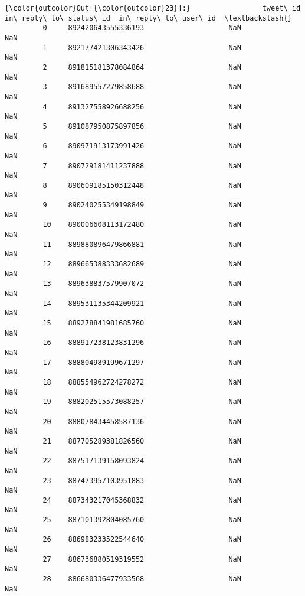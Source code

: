 \documentclass[11pt]{article}
\begin{document}
\begin{Verbatim}[commandchars=\\\{\}]
{\color{outcolor}Out[{\color{outcolor}23}]:}                 tweet\_id  in\_reply\_to\_status\_id  in\_reply\_to\_user\_id  \textbackslash{}
         0     892420643555336193                    NaN                  NaN   
         1     892177421306343426                    NaN                  NaN   
         2     891815181378084864                    NaN                  NaN   
         3     891689557279858688                    NaN                  NaN   
         4     891327558926688256                    NaN                  NaN   
         5     891087950875897856                    NaN                  NaN   
         6     890971913173991426                    NaN                  NaN   
         7     890729181411237888                    NaN                  NaN   
         8     890609185150312448                    NaN                  NaN   
         9     890240255349198849                    NaN                  NaN   
         10    890006608113172480                    NaN                  NaN   
         11    889880896479866881                    NaN                  NaN   
         12    889665388333682689                    NaN                  NaN   
         13    889638837579907072                    NaN                  NaN   
         14    889531135344209921                    NaN                  NaN   
         15    889278841981685760                    NaN                  NaN   
         16    888917238123831296                    NaN                  NaN   
         17    888804989199671297                    NaN                  NaN   
         18    888554962724278272                    NaN                  NaN   
         19    888202515573088257                    NaN                  NaN   
         20    888078434458587136                    NaN                  NaN   
         21    887705289381826560                    NaN                  NaN   
         22    887517139158093824                    NaN                  NaN   
         23    887473957103951883                    NaN                  NaN   
         24    887343217045368832                    NaN                  NaN   
         25    887101392804085760                    NaN                  NaN   
         26    886983233522544640                    NaN                  NaN   
         27    886736880519319552                    NaN                  NaN   
         28    886680336477933568                    NaN                  NaN   

\end{Verbatim}
\end{document}
